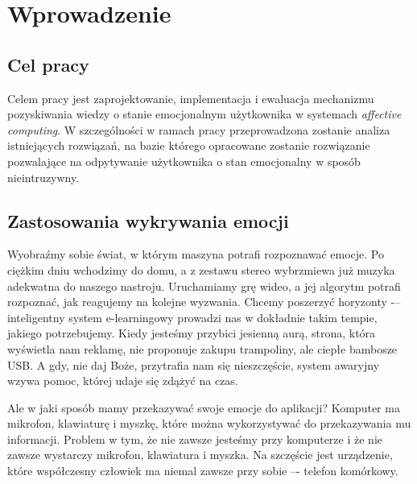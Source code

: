 \chapter{Wprowadzenie}
\label{cha:wprowadzenie}


\section{Cel pracy}
\label{sec:celPracy}

Celem pracy jest zaprojektowanie, implementacja i ewaluacja mechanizmu pozyskiwania wiedzy o stanie emocjonalnym użytkownika w systemach \textit{affective computing}. W szczególności w ramach pracy przeprowadzona zostanie analiza istniejących rozwiązań, na bazie którego opracowane zostanie rozwiązanie pozwalające na odpytywanie użytkownika o stan emocjonalny w sposób nieintruzywny.


\section{Zastosowania wykrywania emocji}
\label{sec:zastosowaniaWykrywaniaEmocji}

Wyobraźmy sobie świat, w którym maszyna potrafi rozpoznawać emocje. Po ciężkim dniu wchodzimy do domu, a z zestawu stereo wybrzmiewa już muzyka adekwatna do naszego nastroju. Uruchamiamy grę wideo, a jej algorytm potrafi rozpoznać, jak reagujemy na kolejne wyzwania. Chcemy poszerzyć horyzonty -– inteligentny system e-learningowy prowadzi nas w dokładnie takim tempie, jakiego potrzebujemy. Kiedy jesteśmy przybici jesienną aurą, strona, która wyświetla nam reklamę, nie proponuje zakupu trampoliny, ale ciepłe bambosze USB. A gdy, nie daj Boże, przytrafia nam się nieszczęście, system awaryjny wzywa pomoc, której udaje się zdążyć na czas.

Ale w jaki sposób mamy przekazywać swoje emocje do aplikacji? Komputer ma mikrofon, klawiaturę i myszkę, które można wykorzystywać do przekazywania mu informacji. Problem w tym, że nie zawsze jesteśmy przy komputerze i że nie zawsze wystarczy mikrofon, klawiatura i myszka. Na szczęście jest urządzenie, które współczesny człowiek ma niemal zawsze przy sobie –- telefon komórkowy.



